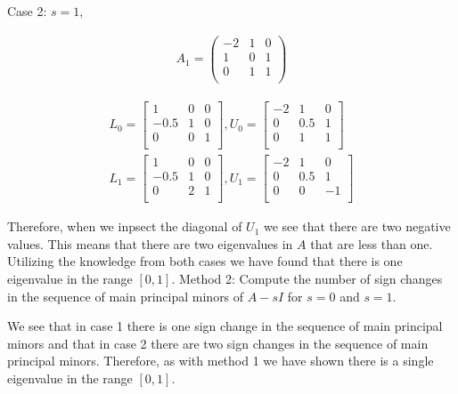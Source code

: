 Case 2: \(s=1\),


\begin{eqnarray}
  A_1 = 
  \begin{pmatrix}
    -2 & 1 & 0 \\
    1 & 0 & 1 \\
    0 & 1 & 1 \\
  \end{pmatrix}
\end{eqnarray}

\begin{eqnarray}
  L_0 =
  \begin{bmatrix}
    1 & 0 & 0 \\
    -0.5 & 1 & 0 \\
    0 & 0 & 1 \\
  \end{bmatrix}
  , U_0 =
  \begin{bmatrix}
    -2 & 1 & 0 \\
    0 & 0.5 & 1 \\
    0 & 1 & 1 \\
  \end{bmatrix}
  \\
  L_1 = 
  \begin{bmatrix}
    1 & 0 & 0 \\
    -0.5 & 1 & 0 \\
    0 & 2 & 1 \\
  \end{bmatrix}
  , U_1 = 
  \begin{bmatrix}
    -2 & 1 & 0 \\
    0 & 0.5 & 1 \\
    0 & 0 & -1 \\
  \end{bmatrix}
\end{eqnarray}

Therefore, when we inpsect the diagonal of \(U_1\) we see that there are two negative values.
This means that there are two eigenvalues in \(A\) that are less than one.
Utilizing the knowledge from both cases we have found that there is one eigenvalue in the range \([0,1]\).
\newpage
Method 2: Compute the number of sign changes in the sequence of main principal minors of \(A-sI\) for \(s=0\) and \(s=1\).




We see that in case 1 there is one sign change in the sequence of main principal minors and that in case 2 there are two sign changes in the sequence of main principal minors.
Therefore, as with method 1 we have shown there is a single eigenvalue in the range \([0,1]\).

